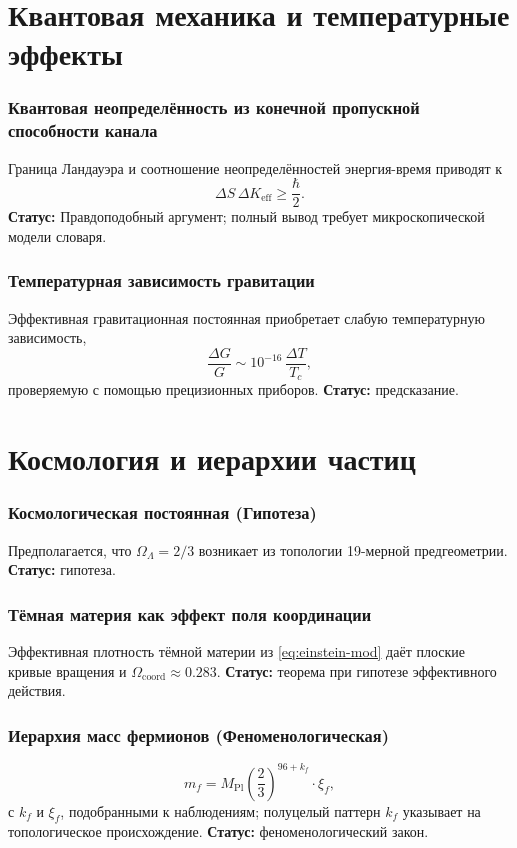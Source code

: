 \documentclass[11pt,a4paper]{article}
\newcommand{\coord}{\mathrm{coord}}
\begin{document}
	\part{Квантовая механика и температурные эффекты}
	
	\section{Квантовая неопределённость из конечной пропускной способности канала}
	Граница Ландауэра и соотношение неопределённостей энергия-время приводят к
	\[
	\Delta S \, \Delta K_{\mathrm{eff}} \ge \frac{\hbar}{2}.
	\]
	\textbf{Статус:} Правдоподобный аргумент; полный вывод требует микроскопической модели словаря.
	
	\section{Температурная зависимость гравитации}
	\label{sec:temperature}
	Эффективная гравитационная постоянная приобретает слабую температурную зависимость,
	\[
	\frac{\Delta G}{G} \sim 10^{-16}\,\frac{\Delta T}{T_c},
	\]
	проверяемую с помощью прецизионных приборов. \textbf{Статус:} предсказание.
	
	\part{Космология и иерархии частиц}
	
	\section{Космологическая постоянная (Гипотеза)}
	\label{sec:Lambda}
	Предполагается, что \(\Omega_\Lambda = 2/3\) возникает из топологии 19-мерной предгеометрии. \textbf{Статус:} гипотеза.
	
	\section{Тёмная материя как эффект поля координации}
	\label{sec:DM}
	Эффективная плотность тёмной материи из \eqref{eq:einstein-mod} даёт плоские кривые вращения и \(\Omega_{\coord} \approx 0.283\). \textbf{Статус:} теорема при гипотезе эффективного действия.
	
	\section{Иерархия масс фермионов (Феноменологическая)}
	\label{sec:masses}
	\[
	m_f = M_{\mathrm{Pl}} \left(\frac{2}{3}\right)^{96 + k_f} \cdot \xi_f,
	\]
	с \(k_f\) и \(\xi_f\), подобранными к наблюдениям; полуцелый паттерн \(k_f\) указывает на топологическое происхождение. \textbf{Статус:} феноменологический закон.
	
\end{document}
